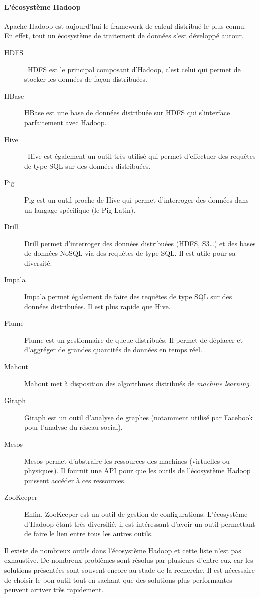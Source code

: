     \paragraph{L'écosystème Hadoop}
    \label{par:L'écosystème Hadoop}
    Apache Hadoop est aujourd'hui le framework de calcul distribué le plus connu. En effet, tout un écosystème de traitement de données s'est développé autour.
    \begin{description}
      \item[HDFS] HDFS est le principal composant d'Hadoop, c'est celui qui permet de stocker les données de façon distribuées.
      \item[HBase] HBase est une base de données distribuée sur HDFS qui s'interface parfaitement avec Hadoop.
      \item[Hive] Hive est également un outil très utilisé qui permet d'effectuer des requêtes de type SQL sur des données distribuées.
      \item[Pig] Pig est un outil proche de Hive qui permet d'interroger des données dans un langage spécifique (le Pig Latin).
      \item[Drill] Drill permet d'interroger des données distribuées (HDFS, S3…) et des bases de données NoSQL via des requêtes de type SQL. Il est utile pour sa diversité.
      \item[Impala] Impala permet également de faire des requêtes de type SQL sur des données distribuées. Il est plus rapide que Hive.
      \item[Flume] Flume est un gestionnaire de queue distribués. Il permet de déplacer et d'aggréger de grandes quantités de données en temps réel.
      \item[Mahout] Mahout met à disposition des algorithmes distribués de \textit{machine learning}.
      \item[Giraph] Giraph est un outil d'analyse de graphes (notamment utilisé par Facebook pour l'analyse du réseau social).
      \item[Mesos] Mesos permet d'abstraire les ressources des machines (virtuelles ou physiques). Il fournit une API pour que les outils de l'écosystème Hadoop puissent accéder à ces ressources.
      \item[ZooKeeper] Enfin, ZooKeeper est un outil de gestion de configurations. L'écosystème d'Hadoop étant très diversifié, il est intéressant d'avoir un outil permettant de faire le lien entre tous les autres outils.
    \end{description}
    Il existe de nombreux outils dans l'écosystème Hadoop et cette liste n'est pas exhaustive. De nombreux problèmes sont résolus par plusieurs d'entre eux car les solutions présentées sont souvent encore au stade de la recherche. Il est nécessaire de choisir le bon outil tout en sachant que des solutions plus performantes peuvent arriver très rapidement.


